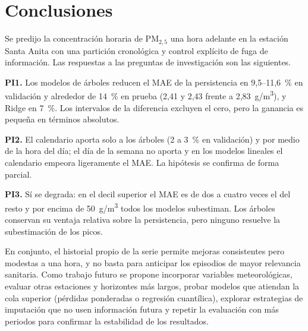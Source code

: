\section{Conclusiones}
\label{sec:conclusiones}
Se predijo la concentración horaria de PM$_{2{,}5}$ una hora adelante en la estación Santa Anita con una partición cronológica y control explícito de fuga de información. Las respuestas a las preguntas de investigación son las siguientes.

\textbf{PI1.} Los modelos de árboles reducen el MAE de la persistencia en 9,5--11,6~\% en validación y alrededor de 14~\% en prueba (2,41 y 2,43 frente a 2,83~\textmu g/m\textsuperscript{3}), y Ridge en 7~\%. Los intervalos de la diferencia excluyen el cero, pero la ganancia es pequeña en términos absolutos.

\textbf{PI2.} El calendario aporta solo a los árboles (2 a 3~\% en validación) y por medio de la hora del día; el día de la semana no aporta y en los modelos lineales el calendario empeora ligeramente el MAE. La hipótesis se confirma de forma parcial.

\textbf{PI3.} Sí se degrada: en el decil superior el MAE es de dos a cuatro veces el del resto y por encima de 50~\textmu g/m\textsuperscript{3} todos los modelos subestiman. Los árboles conservan su ventaja relativa sobre la persistencia, pero ninguno resuelve la subestimación de los picos.

En conjunto, el historial propio de la serie permite mejoras consistentes pero modestas a una hora, y no basta para anticipar los episodios de mayor relevancia sanitaria. Como trabajo futuro se propone incorporar variables meteorológicas, evaluar otras estaciones y horizontes más largos, probar modelos que atiendan la cola superior (pérdidas ponderadas o regresión cuantílica), explorar estrategias de imputación que no usen información futura y repetir la evaluación con más periodos para confirmar la estabilidad de los resultados.
